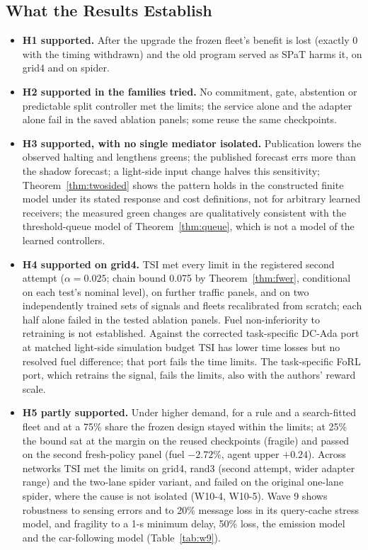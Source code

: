 \subsection{What the Results Establish}
\begin{itemize}\setlength\itemsep{1pt}
\item \textbf{H1 supported.} After the upgrade the frozen fleet's benefit is lost (exactly 0 with the timing withdrawn) and the old program
served as SPaT harms it, on grid4 and on spider.
\item \textbf{H2 supported in the families tried.} No commitment, gate, abstention or predictable split controller met the limits; the
service alone and the adapter alone fail in the saved ablation panels; some reuse the same checkpoints.
\item \textbf{H3 supported, with no single mediator isolated.} Publication lowers the observed halting and lengthens greens; the published
forecast errs more than the shadow forecast; a light-side input change halves this sensitivity; Theorem~\ref{thm:twosided} shows the
pattern holds in the constructed finite model under its stated response and cost definitions, not for arbitrary learned receivers; the measured green changes are qualitatively consistent with the threshold-queue model of
Theorem~\ref{thm:queue}, which is not a model of the learned controllers.
\item \textbf{H4 supported on grid4.} TSI met every limit in the registered second attempt ($\alpha=0.025$; chain bound 0.075 by
Theorem~\ref{thm:fwer}, conditional on each test's nominal level), on further traffic panels, and on two independently trained sets of
signals and fleets recalibrated from scratch; each half alone failed in the tested ablation panels. Fuel non-inferiority to retraining is
not established. Against the corrected task-specific DC-Ada port at matched light-side simulation budget TSI has lower time losses but no
resolved fuel difference; that port fails the time limits. The task-specific FoRL port, which retrains the signal, fails the limits, also with the authors' reward scale.
\item \textbf{H5 partly supported.} Under higher demand, for a rule and a search-fitted fleet and at a 75\% share the frozen design stayed
within the limits; at 25\% the bound sat at the margin on the reused checkpoints (fragile) and passed on the second fresh-policy panel
(fuel $-2.72\%$, agent upper $+0.24$). Across networks TSI met the limits on grid4, rand3 (second attempt, wider adapter range) and the
two-lane spider variant, and failed on the original one-lane spider, where the cause is not isolated (W10-4, W10-5). Wave 9 shows
robustness to sensing errors and to 20\% message loss in its query-cache stress model, and fragility to a 1-s minimum delay, 50\% loss,
the emission model and the car-following model (Table~\ref{tab:w9}).
\end{itemize}


